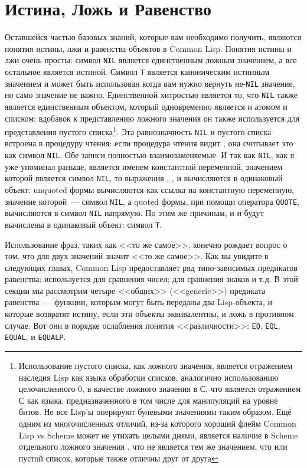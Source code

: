 \section{Истина, Ложь и Равенство}

Оставшейся частью базовых знаний, которые вам необходимо получить, являются понятия
истины, лжи и равенства объектов в Common Lisp. Понятия истины и лжи очень просты: символ
\lstinline{NIL} является единственным ложным значением, а все остальное является
истиной. Символ \lstinline{T} является каноническим истинным значением и может быть
использован когда вам нужно вернуть не-\lstinline{NIL} значение, но само значение не
важно. Единственной хитростью является то, что \lstinline{NIL} также является единственным
объектом, который одновременно является и атомом и списком: вдобавок к представлению
ложного значения он также используется для представления пустого
списка\footnote{Использование пустого списка, как ложного значения, является отражением
  наследия Lisp как языка обработки списков, аналогично использованию целочисленного 0, в
  качестве ложного значения в С, что является отражением С как языка, предназначенного в
  том числе для манипуляций на уровне битов. Не все Lisp'ы оперируют булевыми значениями
  таким образом. Ещё одним из многочисленных отличий, из-за которого хороший флейм Common
  Lisp vs Scheme может не утихать целыми днями, является наличие в Scheme отдельного
  ложного значения , что не является тем же значением, что  или пустой
  список, которые также отличны друг от друга}. Эта равнозначность \lstinline{NIL} и пустого
списка встроена в процедуру чтения: если процедура чтения видит \code{()}, она считывает
это как символ \lstinline{NIL}. Обе записи полностью взаимозаменяемые. И так как
\lstinline{NIL}, как я уже упоминал раньше, является именем константной переменной, значением
которой является символ \lstinline{NIL}, то выражения , \code{()},  и
 вычисляются в одинаковый объект: unquoted формы вычисляются как ссылка на
константную переменную, значение которой~--- символ \lstinline{NIL}, а quoted формы, при
помощи оператора \lstinline{QUOTE}, вычисляются в символ \lstinline{NIL} напрямую. По этим же
причинам, и  и  будут вычислены в одинаковый объект: символ \lstinline{T}.

Использование фраз, таких как <<то же самое>>, конечно рождает вопрос о том, что для двух
значений значит <<то же самое>>. Как вы увидите в следующих главах, Common Lisp
предоставляет ряд типо-зависимых предикатов равенства: \code{=} используется для сравнения
чисел;  для сравнения знаков и т.д. В этой секции мы рассмотрим четыре <<общих>>
(<<generic>>) предиката равенства~--- функции, которым могут быть переданы два Lisp-объекта,
и которые возвратят истину, если эти объекты эквивалентны, и ложь в противном случае. Вот
они в порядке ослабления понятия <<различности>>: \lstinline{EQ}, \lstinline{EQL}, \lstinline{EQUAL},
и \lstinline{EQUALP}.

